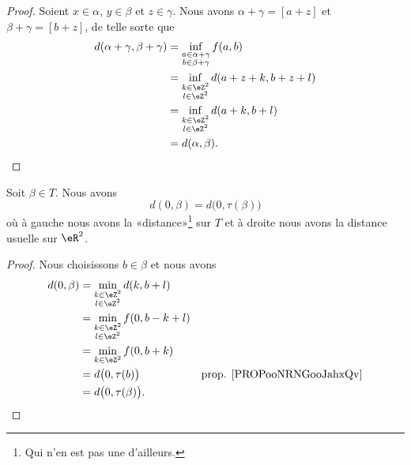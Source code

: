 \begin{proof}
	Soient \( x\in \alpha\), \( y\in \beta\) et \( z\in \gamma\). Nous avons \( \alpha+\gamma=[a+z]\) et \( \beta+\gamma=[b+z]\), de telle sorte que
	\begin{subequations}
		\begin{align}
			d(\alpha+\gamma,\beta+\gamma) & =\inf_{\substack{ a\in\alpha+\gamma \\ b\in \beta+\gamma }  }f(a,b)\\
			                              & =\inf_{\substack{ k\in \eZ^2        \\ l\in \eZ^2 }  }d(a+z+k,b+z+l)\\
			                              & =\inf_{\substack{ k\in \eZ^2        \\ l\in \eZ^2 }  }d(a+k,b+l)\\
			                              & =d(\alpha,\beta).
		\end{align}
	\end{subequations}
\end{proof}

\begin{lemma}	\label{LEMooQNDHooFXYjtj}
	Soit \( \beta\in T\). Nous avons
	\begin{equation}
		d(0,\beta)=d\big( 0,\tau(\beta) \big)
	\end{equation}
	où à gauche nous avons la «distance»\footnote{Qui n'en est pas une d'ailleurs.} sur \( T\) et à droite nous avons la distance usuelle sur \( \eR^2\).
\end{lemma}

\begin{proof}
	Nous choisissons \( b\in \beta\) et nous avons
	\begin{subequations}
		\begin{align}
			d(0,\beta) & =\min_{\substack{ k\in \eZ^2                                         \\ l\in \eZ^2 }  }d(k,b+l)\\
			           & =\min_{\substack{ k\in \eZ^2                                         \\ l\in \eZ^2 }  }f(0,b-k+l)\\
			           & =\min_{k\in\eZ^2}f(0,b+k)                                            \\
			           & =d\big( 0,\tau(b) \big)      & \text{prop. \ref{PROPooNRNGooJahxQv}} \\
			           & =d\big( 0,\tau(\beta) \big).
		\end{align}
	\end{subequations}
\end{proof}



